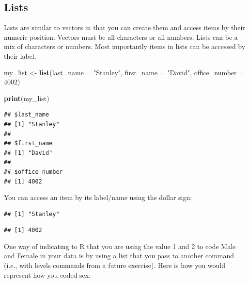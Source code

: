 \documentclass[
]{krantz}
\makeatletter
\newenvironment{Shaded}{\begin{snugshade}}{\end{snugshade}}
\newcommand{\DataTypeTok}[1]{\textcolor[rgb]{0.27,0.27,0.27}{#1}}
\newcommand{\DecValTok}[1]{\textcolor[rgb]{0.06,0.06,0.06}{#1}}
\newcommand{\KeywordTok}[1]{\textcolor[rgb]{0.27,0.27,0.27}{\textbf{#1}}}
\newcommand{\NormalTok}[1]{#1}
\newcommand{\OperatorTok}[1]{\textcolor[rgb]{0.43,0.43,0.43}{\textbf{#1}}}
\newcommand{\StringTok}[1]{\textcolor[rgb]{0.5,0.5,0.5}{#1}}
\newenvironment{kframe}{%
\medskip{}
\setlength{\fboxsep}{.8em}
 \def\at@end@of@kframe{}%
 \ifinner\ifhmode%
  \def\at@end@of@kframe{\end{minipage}}%
  \begin{minipage}{\columnwidth}%
 \fi\fi%
 \def\FrameCommand##1{\hskip\@totalleftmargin \hskip-\fboxsep
 \colorbox{shadecolor}{##1}\hskip-\fboxsep
     \hskip-\linewidth \hskip-\@totalleftmargin \hskip\columnwidth}%
 \MakeFramed {\advance\hsize-\width
   \@totalleftmargin\z@ \linewidth\hsize
   \@setminipage}}%
 {\par\unskip\endMakeFramed%
 \at@end@of@kframe}
\renewenvironment{Shaded}{\begin{kframe}}{\end{kframe}}
\makeatother
\begin{document}
\hypertarget{lists}{%
\subsection{Lists}\label{lists}}

Lists are similar to vectors in that you can create them and access items by their numeric position. Vectors must be all characters or all numbers. Lists can be a mix of characters or numbers. Most importantly items in lists can be accessed by their label.

\begin{Shaded}
\begin{Highlighting}[]
\NormalTok{my_list <-}\StringTok{ }\KeywordTok{list}\NormalTok{(}\DataTypeTok{last_name =} \StringTok{"Stanley"}\NormalTok{,}
                \DataTypeTok{first_name =} \StringTok{"David"}\NormalTok{,}
                \DataTypeTok{office_number =} \DecValTok{4002}\NormalTok{)}

\KeywordTok{print}\NormalTok{(my_list)}
\end{Highlighting}
\end{Shaded}

\begin{verbatim}
## $last_name
## [1] "Stanley"
## 
## $first_name
## [1] "David"
## 
## $office_number
## [1] 4002
\end{verbatim}

You can access an item by its label/name using the dollar sign:

\begin{Shaded}
\end{Shaded}

\begin{verbatim}
## [1] "Stanley"
\end{verbatim}

\begin{Shaded}
\end{Shaded}

\begin{verbatim}
## [1] 4002
\end{verbatim}

One way of indicating to R that you are using the value 1 and 2 to code Male and Female in your data is by using a list that you pass to another command (i.e., with levels commands from a future exercise). Here is how you would represent how you coded sex:
\end{document}
